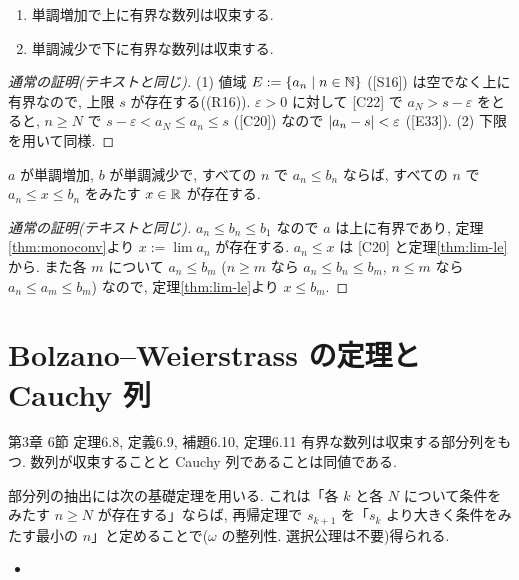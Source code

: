 \begin{thm}\label{thm:monoconv}
  \begin{enumerate}[label=(\arabic*)]
    \item 単調増加で上に有界な数列は収束する.
    \item 単調減少で下に有界な数列は収束する.
  \end{enumerate}
\end{thm}
\begin{proof}[通常の証明(テキストと同じ)]
  (1) 値域 $E := \{a_n \mid n \in \mathbb{N}\}$ ([S16]) は空でなく上に有界なので, 上限 $s$ が存在する((R16)). $\varepsilon > 0$ に対して [C22] で $a_N > s - \varepsilon$ をとると, $n \geq N$ で $s - \varepsilon < a_N \leq a_n \leq s$ ([C20]) なので $\lvert a_n - s\rvert < \varepsilon$ ([E33]). (2) 下限を用いて同様.
\end{proof}

\begin{thm}
  $a$ が単調増加, $b$ が単調減少で, すべての $n$ で $a_n \leq b_n$ ならば, すべての $n$ で $a_n \leq x \leq b_n$ をみたす $x \in \mathbb{R}$ が存在する.
\end{thm}
\begin{proof}[通常の証明(テキストと同じ)]
  $a_n \leq b_n \leq b_1$ なので $a$ は上に有界であり, 定理\ref{thm:monoconv}より $x := \lim a_n$ が存在する. $a_n \leq x$ は [C20] と定理\ref{thm:lim-le}から. また各 $m$ について $a_n \leq b_m$ ($n \geq m$ なら $a_n \leq b_n \leq b_m$, $n \leq m$ なら $a_n \leq a_m \leq b_m$) なので, 定理\ref{thm:lim-le}より $x \leq b_m$.
\end{proof}

\section{Bolzano--Weierstrass の定理と Cauchy 列}

\begin{textref}{第3章 6節 定理6.8, 定義6.9, 補題6.10, 定理6.11}
  有界な数列は収束する部分列をもつ. 数列が収束することと Cauchy 列であることは同値である.
\end{textref}

部分列の抽出には次の基礎定理を用いる. これは「各 $k$ と各 $N$ について条件をみたす $n \geq N$ が存在する」ならば, 再帰定理で $s_{k+1}$ を「$s_k$ より大きく条件をみたす最小の $n$」と定めることで($\omega$ の整列性. 選択公理は不要)得られる.
\begin{itemize}
  \item[{[S28]}] 
\end{itemize}

